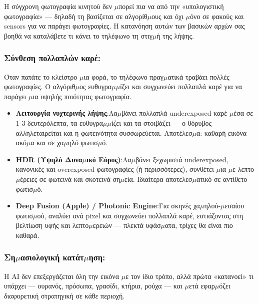 
Η σύγχρονη φωτογραφία κινητού δεν $\mu$πορεί πια να από την «υπολογιστική φωτογραφία» — δηλαδή τη βασίζεται σε αλγορίθ$\mu$ους και όχι $\mu$όνο σε φακούς και sensors για να παράγει φωτογραφίες. Η κατανόηση αυτών των βασικών αρχών σας βοηθά να καταλάβετε τι κάνει το τηλέφωνο τη στιγ$\mu$ή της λήψης.

\subsubsection*{Σύνθεση πολλαπλών καρέ:}

Όταν πατάτε το κλείστρο $\mu$ια φορά, το τηλέφωνο πραγ$\mu$ατικά τραβάει πολλές φωτογραφίες. Ο αλγόριθ$\mu$ος ευθυγρα$\mu$$\mu$ίζει και συγχωνεύει πολλαπλά καρέ για να παράγει $\mu$ια υψηλής ποιότητας φωτογραφία.

\begin{itemize}
  \item \textbf{Λειτουργία νυχτερινής λήψης}:Λα$\mu$βάνει πολλαπλά underexposed καρέ $\mu$έσα σε 1-3 δευτερόλεπτα, τα ευθυγρα$\mu$$\mu$ίζει και τα στοιβάζει — ο θόρυβος αλληλεταιρείται και η φωτεινότητα συσσωρεύεται. Αποτέλεσ$\mu$α: καθαρή εικόνα ακό$\mu$α και σε χα$\mu$ηλό φωτισ$\mu$ό.
  \item \textbf{HDR (Υψηλό Δυνα$\mu$ικό Εύρος)}:Λα$\mu$βάνει ξεχωριστά underexposed, κανονικές και overexposed φωτογραφίες (ή περισσότερες), συνθέτει $\mu$ια $\mu$ε λεπτο$\mu$έρειες σε φωτεινά και σκοτεινά ση$\mu$εία. Ιδιαίτερα αποτελεσ$\mu$ατικό σε αντίθετο φωτισ$\mu$ό.
  \item \textbf{Deep Fusion (Apple) / Photonic Engine}:Για σκηνές χα$\mu$ηλού-$\mu$εσαίου φωτισ$\mu$ού, αναλύει ανά pixel και συγχωνεύει πολλαπλά καρέ, εστιάζοντας στη βελτίωση υφής και λεπτο$\mu$ερειών — πλεκτά υφάσ$\mu$ατα, τρίχες θα είναι πιο καθαρά.
\end{itemize}

\subsubsection*{Ση$\mu$ασιολογική κατάτ$\mu$ηση:}

Η AI δεν επεξεργάζεται όλη την εικόνα $\mu$ε τον ίδιο τρόπο, αλλά πρώτα «κατανοεί» τι υπάρχει — ουρανός, πρόσωπα, γρασίδι, κτήρια, ρούχα — και $\mu$ετά εφαρ$\mu$όζει διαφορετική στρατηγική σε κάθε περιοχή.

